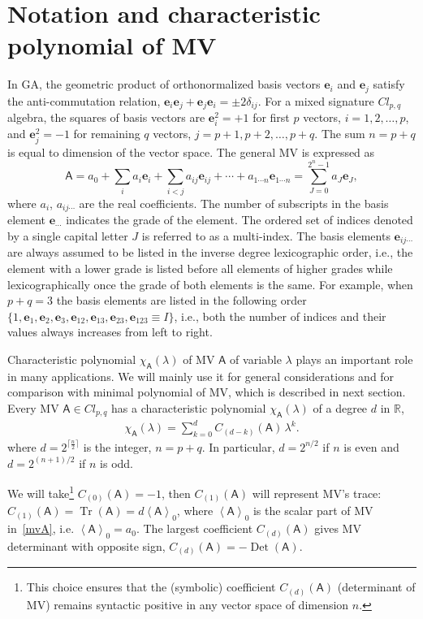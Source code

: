 \documentclass[AMA,STIX1COL]{WileyNJD-v2}
\def\m#1{\mathsf{#1}} %
\newcommand{\cl}[2]{\ensuremath{\mathit{Cl}_{#1,#2}}}
\DeclareMathOperator{\Det}{Det} %
\DeclareMathOperator{\Tr}{Tr}
\newcommand{\bbR}{\ensuremath{\mathbb{R}}}
\def\m#1{\mathsf{#1}}%
\def\e#1{\mathbf{e}_{#1}} %
\begin{document}
\section{Notation and characteristic polynomial of MV}\label{sec:charpoly}

In GA, the geometric product of orthonormalized basis vectors
$\e{i}$ and $\e{j}$ satisfy~\cite{Lounesto1997} the
anti-commutation relation, $\e{i}\e{j}+\e{j}\e{i}=\pm
2\delta_{ij}$.  For a mixed signature \cl{p}{q} algebra, the
squares of basis vectors are $\e{i}^2=+1$ for first $p$ vectors,
$i=1,2,\ldots, p$, and $\e{j}^2=-1$ for remaining $q$ vectors,
$j=p+1,p+2,\ldots, p+q$. The sum $n=p+q$ is equal to dimension of
the vector space. The general MV is expressed as
\begin{equation}\label{mvA}
  \m{A}=a_0+\sum_{i}a_i\e{i}+\sum_{i<j}a_{ij}\e{ij}+\cdots+ a_{1\cdots n} \e{1\cdots n}
  =\sum_{J=0}^{2^n-1}a_J\e{J},
\end{equation}
where $a_i$, $a_{ij\cdots}$ are the real coefficients. The number
of subscripts in the basis element $\e{\cdots }$ indicates the grade
of the element. The ordered set of indices denoted by a single
capital letter $J$ is referred to as a multi-index. The basis
elements $\e{ij\cdots}$ are always assumed to be listed in the
inverse degree lexicographic order, i.e., the element with a lower grade is listed before
all elements of higher grades while lexicographically once the grade of both elements is the same.
For example, when $p+q=3$ the basis elements are listed in
the following order $\{1,\e{1},\e{2},\e{3},\e{12},\e{13},
\e{23},\e{123}\equiv I\}$, i.e., both the number of indices and
their values always increases from left to right.


Characteristic polynomial $\chi_{\m{A}}(\lambda)$ of MV $\m{A}$ of variable $\lambda$
plays an important role in many applications. We will mainly use
it for general considerations and for comparison with minimal
polynomial of MV, which is described in next section. Every MV
$\m{A}\in\cl{p}{q}$ has a characteristic polynomial
$\chi_{\m{A}}(\lambda)$ of a degree $d$ in $\bbR$,
\begin{align}\label{CharPolyDef}
  \chi_{\m{A}}(\lambda)=\sum_{k=0}^{d} C_{(d-k)}(\m{A})\, \lambda ^k.
\end{align}
where
$d=2^{\lceil\tfrac{n}{2}\rceil}$ is the integer, $n=p+q$. In
particular, $d=2^{n/2}$ if $n$ is even and $d=2^{(n+1)/2}$ if $n$
is odd.

We will take\footnote{This choice ensures that the (symbolic)
coefficient $C_{(d)}(\m{A})$ (determinant of MV) remains syntactic positive
in any vector space of dimension $n$.} $C_{(0)}(\m{A})=-1$, then
$C_{(1)}(\m{A})$ will represent MV's trace:
$C_{(1)}(\m{A})=\Tr(\m{A})=d \left\langle\m{A}\right\rangle_{0}$,
where $\left\langle\m{A}\right\rangle_{0}$ is the scalar part of
MV in~\eqref{mvA}, i.e. $\left\langle\m{A}\right\rangle_{0}=a_0$.
The largest  coefficient $C_{(d)}(\m{A})$ gives MV determinant
with opposite sign, $C_{(d)}(\m{A})=-\Det(\m{A})$.
\end{document}
